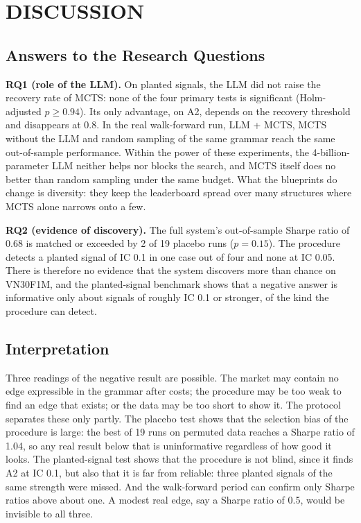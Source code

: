 \documentclass[12pt,a4paper,oneside]{book}
\theoremstyle{definition}
\begin{document}
\chapter{DISCUSSION}
\label{ch5}

\section{Answers to the Research Questions}

\textbf{RQ1 (role of the LLM).} On planted signals, the LLM did not raise the recovery rate of MCTS: none of the four primary tests is significant (Holm-adjusted $p \ge 0.94$). Its only advantage, on A2, depends on the recovery threshold and disappears at 0.8. In the real walk-forward run, LLM + MCTS, MCTS without the LLM and random sampling of the same grammar reach the same out-of-sample performance. Within the power of these experiments, the 4-billion-parameter LLM neither helps nor blocks the search, and MCTS itself does no better than random sampling under the same budget. What the blueprints do change is diversity: they keep the leaderboard spread over many structures where MCTS alone narrows onto a few.

\textbf{RQ2 (evidence of discovery).} The full system's out-of-sample Sharpe ratio of 0.68 is matched or exceeded by 2 of 19 placebo runs ($p = 0.15$). The procedure detects a planted signal of IC 0.1 in one case out of four and none at IC 0.05. There is therefore no evidence that the system discovers more than chance on VN30F1M, and the planted-signal benchmark shows that a negative answer is informative only about signals of roughly IC 0.1 or stronger, of the kind the procedure can detect.

\section{Interpretation}

Three readings of the negative result are possible. The market may contain no edge expressible in the grammar after costs; the procedure may be too weak to find an edge that exists; or the data may be too short to show it. The protocol separates these only partly. The placebo test shows that the selection bias of the procedure is large: the best of 19 runs on permuted data reaches a Sharpe ratio of 1.04, so any real result below that is uninformative regardless of how good it looks. The planted-signal test shows that the procedure is not blind, since it finds A2 at IC 0.1, but also that it is far from reliable: three planted signals of the same strength were missed. And the walk-forward period can confirm only Sharpe ratios above about one. A modest real edge, say a Sharpe ratio of 0.5, would be invisible to all three.
\end{document}
